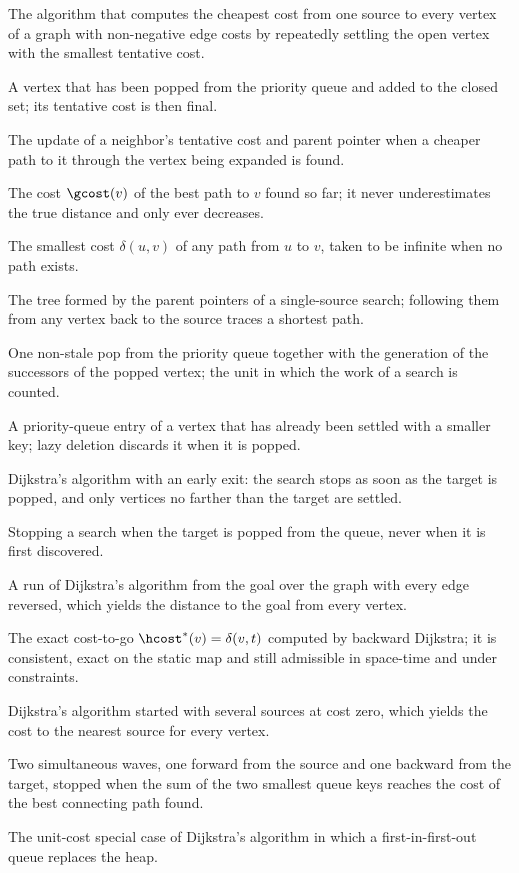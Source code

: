 \item[Dijkstra's algorithm] The algorithm that computes the cheapest cost from one source to every vertex of a graph with non-negative edge costs by repeatedly settling the open vertex with the smallest tentative cost.
\item[Settled vertex] A vertex that has been popped from the priority queue and added to the closed set; its tentative cost is then final.
\item[Relaxation] The update of a neighbor's tentative cost and parent pointer when a cheaper path to it through the vertex being expanded is found.
\item[Tentative cost] The cost $\gcost(v)$ of the best path to $v$ found so far; it never underestimates the true distance and only ever decreases.
\item[Shortest-path distance] The smallest cost $\delta(u,v)$ of any path from $u$ to $v$, taken to be infinite when no path exists.
\item[Shortest-path tree] The tree formed by the parent pointers of a single-source search; following them from any vertex back to the source traces a shortest path.
\item[Expansion] One non-stale pop from the priority queue together with the generation of the successors of the popped vertex; the unit in which the work of a search is counted.
\item[Stale entry] A priority-queue entry of a vertex that has already been settled with a smaller key; lazy deletion discards it when it is popped.
\item[Uniform-cost search] Dijkstra's algorithm with an early exit: the search stops as soon as the target is popped, and only vertices no farther than the target are settled.
\item[Early exit] Stopping a search when the target is popped from the queue, never when it is first discovered.
\item[Backward Dijkstra] A run of Dijkstra's algorithm from the goal over the graph with every edge reversed, which yields the distance to the goal from every vertex.
\item[True-distance heuristic] The exact cost-to-go $\hcost^*(v)=\delta(v,t)$ computed by backward Dijkstra; it is consistent, exact on the static map and still admissible in space-time and under constraints.
\item[Multi-source Dijkstra] Dijkstra's algorithm started with several sources at cost zero, which yields the cost to the nearest source for every vertex.
\item[Bidirectional search] Two simultaneous waves, one forward from the source and one backward from the target, stopped when the sum of the two smallest queue keys reaches the cost of the best connecting path found.
\item[Breadth-first search] The unit-cost special case of Dijkstra's algorithm in which a first-in-first-out queue replaces the heap.
